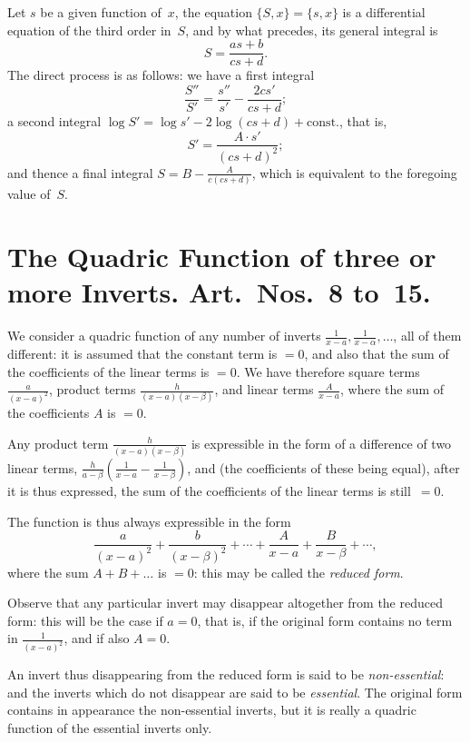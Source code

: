 \documentclass[11pt,a4paper]{book}
\begin{document}
\begin{art}
Let $s$ be a given function of~$x$, the equation $\{S, x\} = \{s, x\}$ is a
differential equation of the third order in~$S$, and by what precedes, its
general integral is
\[
S = \frac{as+b}{cs+d}.
\]
The direct process is as follows: we have a first integral
\[
\frac{S''}{S'} = \frac{s''}{s'} - \frac{2cs'}{cs+d};
\]
a second integral $\log S' = \log s' - 2\log(cs+d) + \text{const.}$, that is,
\[
S' = \frac{A \cdot s'}{(cs+d)^2};
\]
and thence a final integral $S = B - \frac{A}{c(cs+d)}$, which is equivalent
to the foregoing value of~$S$.
\end{art}

\section*{The Quadric Function of three or more Inverts. Art.~Nos.~8 to~15.}

\begin{art}
We consider a quadric function of any number of inverts
$\frac{1}{x-a}, \frac{1}{x-\alpha}, \ldots$, all of them different: it is
assumed that the constant term is $=0$, and also that the sum of the
coefficients of the linear terms is $=0$. We have therefore square terms
$\frac{a}{(x-a)^2}$, product terms $\frac{h}{(x-a)(x-\beta)}$, and linear
terms $\frac{A}{x-a}$, where the sum of the coefficients $A$ is $=0$.

Any product term $\frac{h}{(x-a)(x-\beta)}$ is expressible in the form of a
difference of two linear terms, $\frac{h}{a-\beta}\left(\frac{1}{x-a} - \frac{1}{x-\beta}\right)$,
and (the coefficients of these being equal), after it is thus expressed,
the sum of the coefficients of the linear terms is still~$=0$.

The function is thus always expressible in the form
\[
\frac{a}{(x-a)^2} + \frac{b}{(x-\beta)^2} + \cdots
+ \frac{A}{x-a} + \frac{B}{x-\beta} + \cdots,
\]
where the sum $A + B + \ldots$ is $=0$: this may be called the \textit{reduced form}.
\end{art}

\begin{art}
Observe that any particular invert may disappear altogether from the
reduced form: this will be the case if $a = 0$, that is, if the original
form contains no term in $\frac{1}{(x-a)^2}$, and if also $A = 0$.

An invert thus disappearing from the reduced form is said to be
\textit{non-essential}: and the inverts which do not disappear are said to be
\textit{essential}. The original form contains in appearance the non-essential
inverts, but it is really a quadric function of the essential inverts only.
\end{art}
\end{document}
